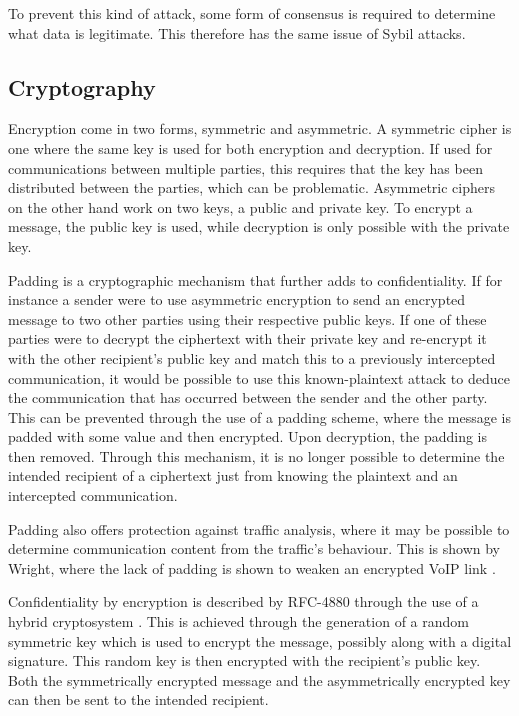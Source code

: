 			To prevent this kind of attack, some form of consensus is required to determine what data is legitimate. This therefore has the same issue of Sybil attacks.
	\subsection{Cryptography}
		Encryption come in two forms, symmetric and asymmetric. A symmetric cipher is one where the same key is used for both encryption and decryption. If used for communications between multiple parties, this requires that the key has been distributed between the parties, which can be problematic. Asymmetric ciphers on the other hand work on two keys, a public and private key. To encrypt a message, the public key is used, while decryption is only possible with the private key. \cite{appliedcrypto}
		
		Padding is a cryptographic mechanism that further adds to confidentiality. If for instance a sender were to use asymmetric encryption to send an encrypted message to two other parties using their respective public keys. If one of these parties were to decrypt the ciphertext with their private key and re-encrypt it with the other recipient's public key and match this to a previously intercepted communication, it would be possible to use this known-plaintext attack to deduce the communication that has occurred between the sender and the other party. This can be prevented through the use of a padding scheme, where the message is padded with some value and then encrypted. Upon decryption, the padding is then removed. Through this mechanism, it is no longer possible to determine the intended recipient of a ciphertext just from knowing the plaintext and an intercepted communication.
		
		Padding also offers protection against traffic analysis, where it may be possible to determine communication content from the traffic's behaviour. This is shown by Wright, where the lack of padding is shown to weaken an encrypted VoIP link \cite{Wright:2010:USP:1880022.1880029}.
	
		Confidentiality by encryption is described by RFC-4880 through the use of a hybrid cryptosystem \cite{network2007openpgp}. This is achieved through the generation of a random symmetric key which is used to encrypt the message, possibly along with a digital signature. This random key is then encrypted with the recipient's public key. Both the symmetrically encrypted message and the asymmetrically encrypted key can then be sent to the intended recipient.